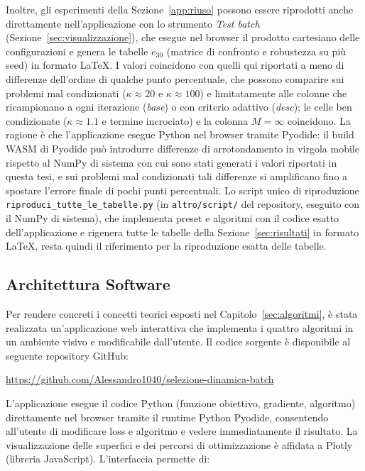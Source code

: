 \documentclass[a4paper,12pt]{article}
\numberwithin{equation}{section}
\numberwithin{figure}{section}
\numberwithin{table}{section}
\begin{document}
Inoltre, gli esperimenti della Sezione~\ref{app:riuso} possono essere
riprodotti anche direttamente nell'applicazione con lo strumento
\emph{Test batch} (Sezione~\ref{sec:visualizzazione}), che esegue nel browser
il prodotto cartesiano delle configurazioni e genera le tabelle
$e_{30}$ (matrice di confronto e robustezza su più seed) in formato LaTeX.
I valori coincidono con quelli qui riportati a meno di differenze dell'ordine
di qualche punto percentuale, che possono comparire sui problemi mal
condizionati ($\kappa \approx 20$ e $\kappa \approx 100$) e limitatamente alle
colonne che ricampionano a ogni iterazione (\emph{base}) o con criterio
adattivo (\emph{desc}); le celle ben condizionate ($\kappa \approx 1.1$ e
termine incrociato) e la colonna $M{=}\infty$ coincidono. La ragione è che
l'applicazione esegue Python nel browser tramite Pyodide: il build WASM di
Pyodide può introdurre differenze di arrotondamento in virgola mobile rispetto
al NumPy di sistema con cui sono stati generati i valori riportati in questa
tesi, e sui problemi mal condizionati tali differenze si amplificano fino a
spostare l'errore finale di pochi punti percentuali. Lo script unico di
riproduzione \texttt{riproduci\_tutte\_le\_tabelle.py} (in
\texttt{altro/script/} del repository, eseguito con il NumPy di sistema), che
implementa preset e algoritmi con il codice esatto dell'applicazione e
rigenera tutte le tabelle della Sezione~\ref{sec:risultati} in formato LaTeX,
resta quindi il riferimento per la riproduzione esatta delle tabelle.

\subsection{Architettura Software}\label{sec:architettura}

Per rendere concreti i concetti teorici esposti nel
Capitolo~\ref{sec:algoritmi}, è stata realizzata un'applicazione web
interattiva che implementa i quattro algoritmi in un ambiente visivo e
modificabile dall'utente. Il codice sorgente è disponibile al seguente
repository GitHub:
\begin{center}
  \url{https://github.com/Alessandro1040/selezione-dinamica-batch}
\end{center}

L'applicazione esegue il codice Python (funzione obiettivo, gradiente,
algoritmo) direttamente nel browser tramite il runtime Python
Pyodide, consentendo all'utente di modificare loss e algoritmo e vedere
immediatamente il risultato. La visualizzazione delle superfici e dei
percorsi di ottimizzazione è affidata a Plotly (libreria JavaScript).
L'interfaccia permette di:
\end{document}
